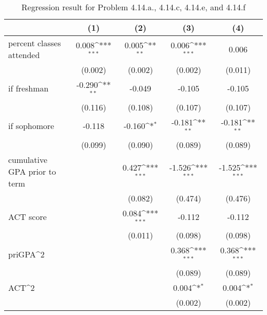 \begin{table}[htbp]\centering
\def\sym#1{\ifmmode^{#1}\else\(^{#1}\)\fi}
\caption{Regression result for Problem 4.14.a., 4.14.c, 4.14.e, and 4.14.f}
\begin{tabular}{l*{4}{c}}
\toprule
                    &\multicolumn{1}{c}{(1)}         &\multicolumn{1}{c}{(2)}         &\multicolumn{1}{c}{(3)}         &\multicolumn{1}{c}{(4)}         \\
\midrule
percent classes attended&       0.008\sym{***}&       0.005\sym{**} &       0.006\sym{***}&       0.006         \\
                    &     (0.002)         &     (0.002)         &     (0.002)         &     (0.011)         \\
\addlinespace
=1 if freshman      &      -0.290\sym{**} &      -0.049         &      -0.105         &      -0.105         \\
                    &     (0.116)         &     (0.108)         &     (0.107)         &     (0.107)         \\
\addlinespace
=1 if sophomore     &      -0.118         &      -0.160\sym{*}  &      -0.181\sym{**} &      -0.181\sym{**} \\
                    &     (0.099)         &     (0.090)         &     (0.089)         &     (0.089)         \\
\addlinespace
cumulative GPA prior to term&                     &       0.427\sym{***}&      -1.526\sym{***}&      -1.525\sym{***}\\
                    &                     &     (0.082)         &     (0.474)         &     (0.476)         \\
\addlinespace
ACT score           &                     &       0.084\sym{***}&      -0.112         &      -0.112         \\
                    &                     &     (0.011)         &     (0.098)         &     (0.098)         \\
\addlinespace
priGPA^2            &                     &                     &       0.368\sym{***}&       0.368\sym{***}\\
                    &                     &                     &     (0.089)         &     (0.089)         \\
\addlinespace
ACT^2               &                     &                     &       0.004\sym{*}  &       0.004\sym{*}  \\
                    &                     &                     &     (0.002)         &     (0.002)         \\

\end{tabular}
\end{table}
